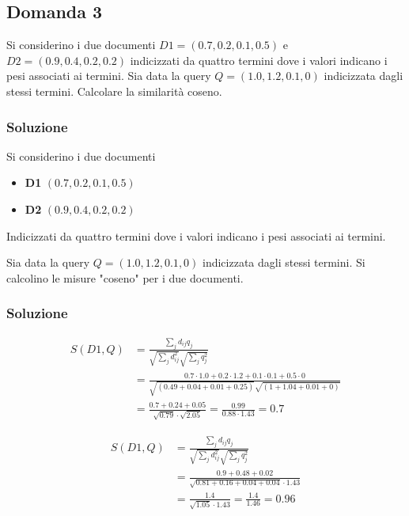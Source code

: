 \subsection{Domanda 3}

Si considerino i due documenti $D1 = (0.7, 0.2, 0.1, 0.5)$ e $D2 = (0.9, 0.4, 0.2, 0.2)$ indicizzati da quattro termini dove i valori indicano i pesi associati ai termini. 
Sia data la query $Q = (1.0, 1.2, 0.1, 0)$ indicizzata dagli stessi termini. Calcolare la similarità coseno. 

\subsubsection{Soluzione}

Si considerino i due documenti

\begin{itemize}
	\item \textbf{D1} $(0.7, 0.2, 0.1, 0.5)$
	\item \textbf{D2} $(0.9, 0.4, 0.2, 0.2)$
\end{itemize}

Indicizzati da quattro termini dove i valori indicano i pesi associati ai termini.

Sia data la query $Q = (1.0, 1.2, 0.1, 0)$ indicizzata dagli stessi termini. Si calcolino le misure "coseno" per i due documenti.

\subsubsection{Soluzione}

\begin{align*}
S(D1, Q) &= \frac{
	\sum_j d_{ij}q_j
}{
	\sqrt{\sum_j d_{ij}^2}\sqrt{\sum_j q_{j}^2}
} \\
&= \frac{
	0.7\cdot 1.0 + 0.2 \cdot 1.2 + 0.1 \cdot 0.1 + 0.5 \cdot 0
}{
	\sqrt{(0.49 + 0.04 + 0.01 + 0.25)} \sqrt{(1 + 1.04 + 0.01 + 0)}
}\\
&= \frac{0.7 + 0.24 + 0.05}{\sqrt{0.79} \cdot \sqrt{2.05}} = \frac{0.99}{0.88 \cdot 1.43} = 0.7
\end{align*}

\begin{align*}
S(D1, Q) &= \frac{
	\sum_j d_{ij}q_j
}{
	\sqrt{\sum_j d_{ij}^2}\sqrt{\sum_j q_{j}^2}
} \\
&= \frac{
	0.9 + 0.48+ 0.02
}{
	\sqrt{0.81 + 0.16 + 0.04 + 0.04}\cdot 1.43
}\\
&= \frac{
	1.4
}{
	\sqrt{1.05}\cdot 1.43
} = \frac{1.4}{1.46} = 0.96
\end{align*}

